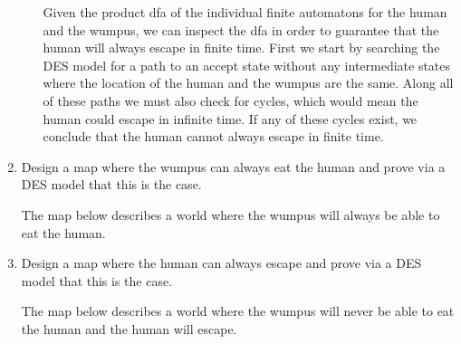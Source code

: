 \documentclass[12pt,letterpaper]{ntdhw}
\begin{document}
\begin{enumerate}
\begin{enumerate}
    Given the product dfa of the individual finite automatons for the human and the wumpus, we can inspect the dfa in order to guarantee that the human will always escape in finite time. First we start by searching the DES model for a path to an accept state without any intermediate states where the location of the human and the wumpus are the same. Along all of these paths we must also check for cycles, which would mean the human could escape in infinite time.  If any of these cycles exist, we conclude that the human cannot always escape in finite time.
  \end{enumerate}

  \item Design a map where the wumpus can always eat the human and
  prove via a DES model that this is the case.

  The map below describes a world where the wumpus will always be able to eat the human.
  \begin{center}
  \label{fig:map3}
\end{center}

  \item Design a map where the human can always escape and prove via a
  DES model that this is the case.
  
    The map below describes a world where the wumpus will never be able to eat the human and the human will escape.
    
    \begin{center}
      \label{fig:map4}
    \end{center}

\end{enumerate}
\end{document}
